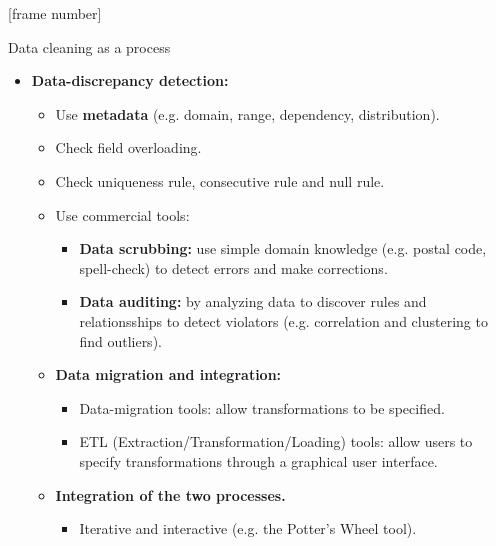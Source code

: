 \documentclass[aspectratio=169,t]{beamer}
\begin{document}
 {
    [frame number]
    \begin{frame}{Data cleaning as a process}
    \begin{itemize}
      \item \textbf{Data-discrepancy detection:}
      \begin{itemize}
        \item Use \textbf{\color{airforceblue}metadata} (e.g. domain, range, dependency, distribution).
        \item Check field overloading.
        \item Check uniqueness rule, consecutive rule and null rule.
        \item Use commercial tools:
        \begin{itemize}
          \item \textbf{\color{airforceblue}Data scrubbing:} use simple domain knowledge (e.g. postal code, spell-check) to detect errors and make corrections.
          \item \textbf{\color{airforceblue}Data auditing:} by analyzing data to discover rules and relationsships to detect violators (e.g. correlation and clustering to find outliers).
        \end{itemize}
        \item \textbf{Data migration and integration:}
        \begin{itemize}
          \item Data-migration tools: allow transformations to be specified.
          \item ETL (Extraction/Transformation/Loading) tools: allow users to specify transformations through a graphical user interface.
        \end{itemize}
        \item \textbf{Integration of the two processes.}
        \begin{itemize}
          \item Iterative and interactive (e.g. the Potter's Wheel tool).
        \end{itemize}
      \end{itemize}
    \end{itemize}
    \end{frame}
  }
\end{document}
